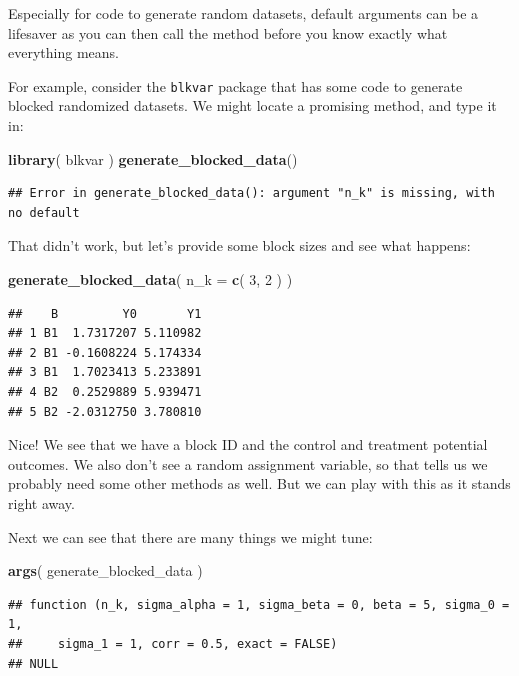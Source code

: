 \documentclass[
]{book}
\newenvironment{Shaded}{\begin{snugshade}}{\end{snugshade}}
\newcommand{\AttributeTok}[1]{\textcolor[rgb]{0.13,0.29,0.53}{#1}}
\newcommand{\DecValTok}[1]{\textcolor[rgb]{0.00,0.00,0.81}{#1}}
\newcommand{\FunctionTok}[1]{\textcolor[rgb]{0.13,0.29,0.53}{\textbf{#1}}}
\newcommand{\NormalTok}[1]{#1}
\begin{document}
Especially for code to generate random datasets, default arguments can be a lifesaver as you can then call the method before you know exactly what everything means.

For example, consider the \texttt{blkvar} package that has some code to generate blocked randomized datasets.
We might locate a promising method, and type it in:

\begin{Shaded}
\begin{Highlighting}[]
\FunctionTok{library}\NormalTok{( blkvar )}
\FunctionTok{generate\_blocked\_data}\NormalTok{()}
\end{Highlighting}
\end{Shaded}

\begin{verbatim}
## Error in generate_blocked_data(): argument "n_k" is missing, with no default
\end{verbatim}

That didn't work, but let's provide some block sizes and see what happens:

\begin{Shaded}
\begin{Highlighting}[]
\FunctionTok{generate\_blocked\_data}\NormalTok{( }\AttributeTok{n\_k =} \FunctionTok{c}\NormalTok{( }\DecValTok{3}\NormalTok{, }\DecValTok{2}\NormalTok{ ) )}
\end{Highlighting}
\end{Shaded}

\begin{verbatim}
##    B         Y0       Y1
## 1 B1  1.7317207 5.110982
## 2 B1 -0.1608224 5.174334
## 3 B1  1.7023413 5.233891
## 4 B2  0.2529889 5.939471
## 5 B2 -2.0312750 3.780810
\end{verbatim}

Nice! We see that we have a block ID and the control and treatment potential outcomes. We also don't see a random assignment variable, so that tells us we probably need some other methods as well.
But we can play with this as it stands right away.

Next we can see that there are many things we might tune:

\begin{Shaded}
\begin{Highlighting}[]
\FunctionTok{args}\NormalTok{( generate\_blocked\_data )}
\end{Highlighting}
\end{Shaded}

\begin{verbatim}
## function (n_k, sigma_alpha = 1, sigma_beta = 0, beta = 5, sigma_0 = 1, 
##     sigma_1 = 1, corr = 0.5, exact = FALSE) 
## NULL
\end{verbatim}
\end{document}
